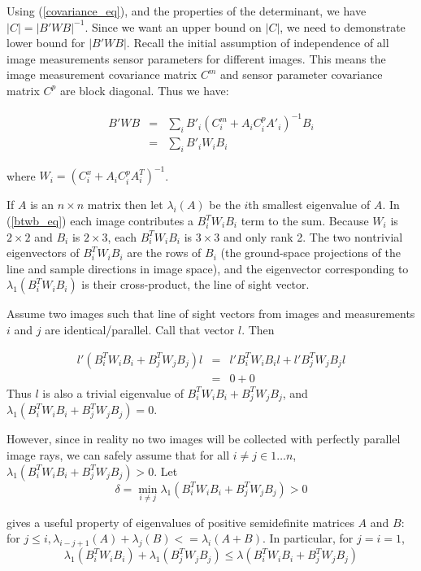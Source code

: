 \documentclass[10pt]{amsart}
\newcommand{\btwbi}{B^T_iW_iB_i}
\newcommand{\btwbj}{B^T_jW_jB_j}
\begin{document}
Using (\ref{covariance_eq}), and the properties of the determinant, we have $|C|
= |B'WB|^{-1}$. Since we want an upper bound on $|C|$, we need to demonstrate
lower bound for $|B'WB|$. Recall the initial assumption of independence of all
image measurements sensor parameters for different images.  This means the image
measurement covariance matrix $C^m$ and sensor parameter covariance matrix $C^p$
are block diagonal. Thus we have:

\begin{eqnarray}\label{btwb_eq}
B'WB & = & \sum_{i}B'_i(C^m_i + A_iC^p_iA'_i)^{-1}B_i \nonumber \\
     & = & \sum_{i}B'_iW_iB_i
\end{eqnarray}

where $W_i = (C^x_i + A_iC^p_iA^T_i)^{-1}$.

If $A$ is an $n\times n$ matrix then let $\lambda_i(A)$ be the $i$th smallest
eigenvalue of $A$.  In (\ref{btwb_eq}) each image contributes a $\btwbi$ term to
the sum. Because $W_i$ is $2\times 2$ and $B_i$ is $2\times 3$, each $\btwbi$ is
$3\times 3$ and only rank 2. The two nontrivial eigenvectors of $\btwbi$ are the
rows of $B_i$ (the ground-space projections of the line and sample directions in
image space), and the eigenvector corresponding to $\lambda_1(\btwbi)$ is their
cross-product, the line of sight vector.

Assume two images such that line of sight vectors from images and measurements
$i$ and $j$ are identical/parallel. Call that vector $l$. Then 

\begin{eqnarray*}
l'(\btwbi+\btwbj)l & = & l'\btwbi l + l'\btwbj l \\
                   & = & 0 + 0
\end{eqnarray*}
Thus $l$ is also a trivial eigenvalue of $\btwbi+\btwbj$, and $\lambda_1(\btwbi+\btwbj)=0$.

However, since in reality no two images will be collected with perfectly
parallel image rays, we can safely assume that for all $i\ne j\in 1\ldots n$,
$\lambda_1(\btwbi+\btwbj)>0$. Let 
\begin{equation}\label{w_assumption_eq}
\delta = \min_{i\ne j}\lambda_1(\btwbi+\btwbj) > 0
\end{equation}

\cite{H_AND_J} gives a useful property of eigenvalues of positive semidefinite
matrices $A$ and $B$: for $j\le i,
\lambda_{i-j+1}(A)+\lambda_j(B)<=\lambda_i(A+B)$.
In particular, for $j=i=1$,
\begin{equation}\label{HJ_4_3_1}
\lambda_1(\btwbi)+\lambda_1(\btwbj) \le \lambda(\btwbi+\btwbj)
\end{equation}
\end{document}
